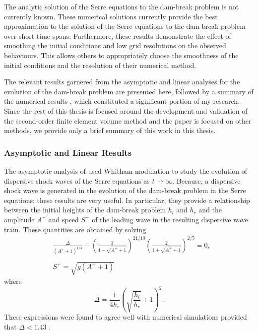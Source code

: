 The analytic solution of the Serre equations to the dam-break problem is not currently known. These numerical solutions \cite{Pitt-2018-61} currently provide the best approximation to the solution of the Serre equations to the dam-break problem over short time spans. Furthermore, these results demonstrate the effect of smoothing the initial conditions and low grid resolutions on the observed behaviours. This allows others to appropriately choose the smoothness of the initial conditions and the resolution of their numerical method.

The relevant results garnered from the asymptotic \cite{El-etal-2006} and linear \cite{Dougalis-etal-2007} analyses for the evolution of the dam-break problem are presented here, followed by a summary of the numerical results \cite{Pitt-2018-61}, which constituted a significant portion of my research. Since the rest of this thesis is focused around the development and validation of the second-order finite element volume method and the paper \cite{Pitt-2018-61} is focused on other methods, we provide only a brief summary of this work in this thesis.

\subsubsection{Asymptotic and Linear Results}
The asymptotic analysis of \citet{El-etal-2006} used Whitham modulation to study the evolution of dispersive shock waves of the Serre equations as $t\rightarrow \infty$. Because, a dispersive shock wave is generated in the evolution of the dam-break problem in the Serre equations; these results are very useful. In particular, they provide a relationship between the initial heights of the dam-break problem $h_l$ and $h_r$ and the amplitude $A^+$ and speed $S^+$ of the leading wave in the resulting dispersive wave train. These quantities are obtained by solving
\begin{subequations}
	\begin{align}
	&\frac{\Delta}{\left(A^+ + 1\right)^{1/4}} - \left(\frac{3}{4 -  \sqrt{A^+ + 1}}\right)^{21/10} \left(\frac{2}{1 + \sqrt{A^+ + 1}}\right)^{2/5} = 0,	\label{eqn:Aplusdef} \\  \nonumber \\
	&S^+ = \sqrt{g \left(A^+ + 1\right)}	\label{eqn:Splusdef}
	\end{align}
	\label{eqn:ELWhitMod}	
\end{subequations}
where
\begin{equation*}
\Delta = \frac{1}{4 h_r}\left(\sqrt{\dfrac{h_l}{h_r}} + 1\right)^2.
\end{equation*}
These expressions were found to agree well with numerical simulations provided that $\Delta < 1.43$ \cite{El-etal-2006}.

